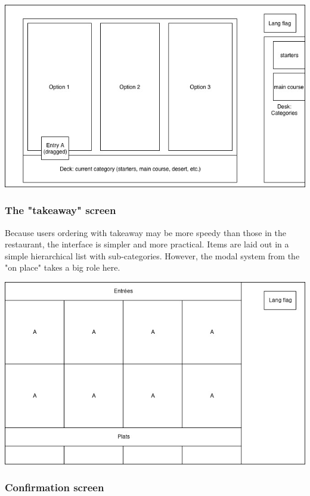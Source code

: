\documentclass[a4paper,12pt]{article}
\begin{document}
\begin{center}
	\includegraphics[width=\textwidth]{in_place_drag_options.jpg}
\end{center}

\subsubsection{The "takeaway" screen}

Because users ordering with takeaway may be more speedy than those in the restaurant, the interface is simpler and
more practical. Items are laid out in a simple hierarchical list with sub-categories. However, the modal system from
the "on place" takes a big role here.

\begin{center}
	\includegraphics[width=\textwidth]{takeaway_screen.jpg}
\end{center}

\subsubsection{Confirmation screen}
\end{document}
